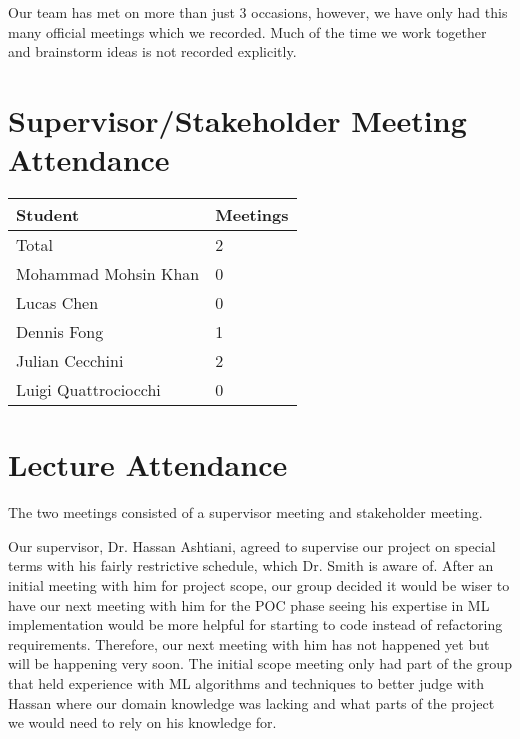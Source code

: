 \documentclass{article}
\begin{document}
Our team has met on more than just 3 occasions, however, we have only
had this many official meetings which we recorded. Much of the time
we work together and brainstorm ideas is not recorded explicitly.

\section{Supervisor/Stakeholder Meeting Attendance}


\begin{table}[H]
\centering
\begin{tabular}{ll}
\toprule
\textbf{Student} & \textbf{Meetings}\\
\midrule
Total & 2\\
Mohammad Mohsin Khan & 0\\
Lucas Chen & 0\\
Dennis Fong & 1\\
Julian Cecchini & 2\\
Luigi Quattrociocchi & 0\\
\bottomrule
\end{tabular}
\end{table}


\section{Lecture Attendance}

The two meetings consisted of a supervisor meeting and stakeholder meeting. 


Our supervisor, Dr. Hassan Ashtiani, agreed to supervise our project on special terms with his 
fairly restrictive schedule, which Dr. Smith is aware of. After an initial meeting with 
him for project scope, our group decided it would be wiser to have our next meeting with him 
for the POC phase seeing his expertise in ML implementation would be more helpful for starting
to code instead of refactoring requirements. Therefore, our next meeting with him has not happened
yet but will be happening very soon. The initial scope meeting only had part of the group that
held experience with ML algorithms and techniques to better judge with Hassan where our domain 
knowledge was lacking and what parts of the project we would need to rely on his knowledge for.
\end{document}
